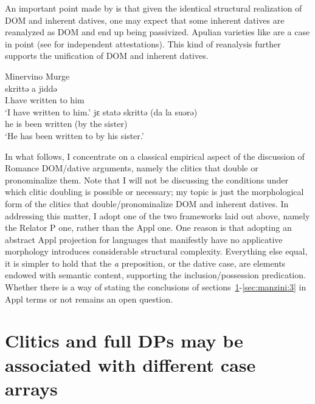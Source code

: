 \documentclass[output=paper,colorlinks,citecolor=brown,nonflat]{./langscibook}
\begin{document}
An important point made by \citet{Pineda2016} is that given the identical structural realization of DOM and inherent datives, one may expect that some inherent datives are reanalyzed as DOM and end up being passivized. Apulian varieties like  are a case in point (see \citealt{Loporcaro1988, Ledgeway2000} for independent attestations). This kind of reanalysis further supports the unification of DOM and inherent datives.

\ea%
    \label{ex:manzini:9}
    Minervino Murge\\
    \ea\label{ex:manzini:9a} 
       {skrittə}   {a} {jiddə}\\
        I.have  written  to him\\
    \glt ‘I have written to him.’
    \ex\label{ex:manzini:9b}
       {jɛ}   {statə}   {skrittə}   (da la suərə)\\
        he  is  been   written (by the sister)\\
    \glt ‘He has been written to by his sister.’
    \z
\z

In what follows, I concentrate on a classical empirical aspect of the discussion of Romance DOM/dative arguments, namely the clitics that double or pronominalize them. Note that I will not be discussing the conditions under which clitic doubling is possible or necessary; my topic is just the morphological form of the clitics that double/pronominalize DOM and inherent datives. In addressing this matter, I adopt one of the two frameworks laid out above, namely the Relator P one, rather than the Appl one. One reason is that adopting an abstract Appl projection for languages that manifestly have no applicative morphology introduces considerable structural complexity. Everything else equal, it is simpler to hold that the \textit{a} preposition, or the dative case, are elements endowed with semantic content, supporting the inclusion/possession predication. Whether there is a way of stating the conclusions of sections~\ref{sec:manzini:2}-\ref{sec:manzini:3} in Appl terms or not remains an open question.

\section{Clitics and full DPs may be associated with different case arrays}\label{sec:manzini:2}
\end{document}
